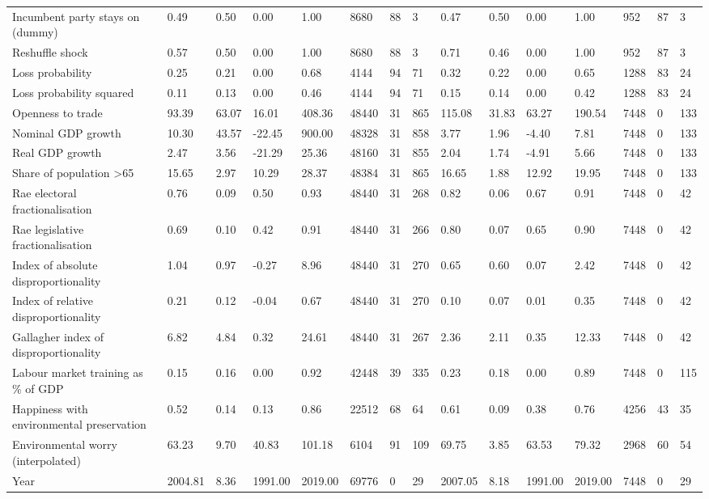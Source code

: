 \begin{longtable}{lllllllllllllll}
Incumbent party stays on (dummy) & 0.49 & 0.50 & 0.00 & 1.00 & 8680 & 88 & 3 & 0.47 & 0.50 & 0.00 & 1.00 & 952 & 87 & 3\\
Reshuffle shock & 0.57 & 0.50 & 0.00 & 1.00 & 8680 & 88 & 3 & 0.71 & 0.46 & 0.00 & 1.00 & 952 & 87 & 3\\
Loss probability & 0.25 & 0.21 & 0.00 & 0.68 & 4144 & 94 & 71 & 0.32 & 0.22 & 0.00 & 0.65 & 1288 & 83 & 24\\
\addlinespace
Loss probability squared & 0.11 & 0.13 & 0.00 & 0.46 & 4144 & 94 & 71 & 0.15 & 0.14 & 0.00 & 0.42 & 1288 & 83 & 24\\
Openness to trade & 93.39 & 63.07 & 16.01 & 408.36 & 48440 & 31 & 865 & 115.08 & 31.83 & 63.27 & 190.54 & 7448 & 0 & 133\\
Nominal GDP growth & 10.30 & 43.57 & -22.45 & 900.00 & 48328 & 31 & 858 & 3.77 & 1.96 & -4.40 & 7.81 & 7448 & 0 & 133\\
Real GDP growth & 2.47 & 3.56 & -21.29 & 25.36 & 48160 & 31 & 855 & 2.04 & 1.74 & -4.91 & 5.66 & 7448 & 0 & 133\\
Share of population >65 & 15.65 & 2.97 & 10.29 & 28.37 & 48384 & 31 & 865 & 16.65 & 1.88 & 12.92 & 19.95 & 7448 & 0 & 133\\
\addlinespace
Rae electoral fractionalisation & 0.76 & 0.09 & 0.50 & 0.93 & 48440 & 31 & 268 & 0.82 & 0.06 & 0.67 & 0.91 & 7448 & 0 & 42\\
Rae legislative fractionalisation & 0.69 & 0.10 & 0.42 & 0.91 & 48440 & 31 & 266 & 0.80 & 0.07 & 0.65 & 0.90 & 7448 & 0 & 42\\
Index of absolute disproportionality & 1.04 & 0.97 & -0.27 & 8.96 & 48440 & 31 & 270 & 0.65 & 0.60 & 0.07 & 2.42 & 7448 & 0 & 42\\
Index of relative disproportionality & 0.21 & 0.12 & -0.04 & 0.67 & 48440 & 31 & 270 & 0.10 & 0.07 & 0.01 & 0.35 & 7448 & 0 & 42\\
Gallagher index of disproportionality & 6.82 & 4.84 & 0.32 & 24.61 & 48440 & 31 & 267 & 2.36 & 2.11 & 0.35 & 12.33 & 7448 & 0 & 42\\
\addlinespace
Labour market training as \% of GDP & 0.15 & 0.16 & 0.00 & 0.92 & 42448 & 39 & 335 & 0.23 & 0.18 & 0.00 & 0.89 & 7448 & 0 & 115\\
Happiness with environmental preservation & 0.52 & 0.14 & 0.13 & 0.86 & 22512 & 68 & 64 & 0.61 & 0.09 & 0.38 & 0.76 & 4256 & 43 & 35\\
Environmental worry (interpolated) & 63.23 & 9.70 & 40.83 & 101.18 & 6104 & 91 & 109 & 69.75 & 3.85 & 63.53 & 79.32 & 2968 & 60 & 54\\
Year & 2004.81 & 8.36 & 1991.00 & 2019.00 & 69776 & 0 & 29 & 2007.05 & 8.18 & 1991.00 & 2019.00 & 7448 & 0 & 29\\
\bottomrule
\end{longtable}
